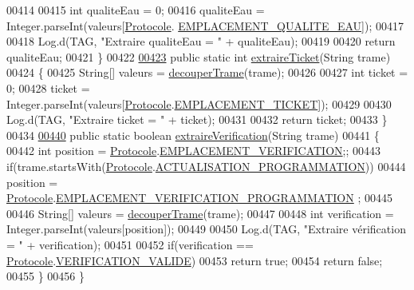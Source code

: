 \begin{DoxyCode}
00414 
00415         \textcolor{keywordtype}{int} qualiteEau = 0;
00416         qualiteEau = Integer.parseInt(valeurs[\hyperlink{classcom_1_1example_1_1ekawa_1_1_protocole}{Protocole}.
      \hyperlink{classcom_1_1example_1_1ekawa_1_1_protocole_aeb21f04096c5f1220c172bfdfbdd5dae}{EMPLACEMENT\_QUALITE\_EAU}]);
00417 
00418         Log.d(TAG, \textcolor{stringliteral}{"Extraire qualiteEau = "} + qualiteEau);
00419 
00420         \textcolor{keywordflow}{return} qualiteEau;
00421     \}
00422 
\hyperlink{classcom_1_1example_1_1ekawa_1_1_protocole_a4997ef198a7f87d76c2f68849caae8d7}{00423}     \textcolor{keyword}{public} \textcolor{keyword}{static} \textcolor{keywordtype}{int} \hyperlink{classcom_1_1example_1_1ekawa_1_1_protocole_a4997ef198a7f87d76c2f68849caae8d7}{extraireTicket}(String trame)
00424     \{
00425         String[] valeurs = \hyperlink{classcom_1_1example_1_1ekawa_1_1_protocole_a23c261e4ab5ad3c2ac60187f04ae40ea}{decouperTrame}(trame);
00426 
00427         \textcolor{keywordtype}{int} ticket = 0;
00428         ticket = Integer.parseInt(valeurs[\hyperlink{classcom_1_1example_1_1ekawa_1_1_protocole}{Protocole}.\hyperlink{classcom_1_1example_1_1ekawa_1_1_protocole_a6250b8095974b868336c880dc5c68f7f}{EMPLACEMENT\_TICKET}]);
00429 
00430         Log.d(TAG, \textcolor{stringliteral}{"Extraire ticket = "} + ticket);
00431 
00432         \textcolor{keywordflow}{return} ticket;
00433     \}
00434 
\hyperlink{classcom_1_1example_1_1ekawa_1_1_protocole_add9d5727209d29af21fa468e6929fe0b}{00440}     \textcolor{keyword}{public} \textcolor{keyword}{static} \textcolor{keywordtype}{boolean} \hyperlink{classcom_1_1example_1_1ekawa_1_1_protocole_add9d5727209d29af21fa468e6929fe0b}{extraireVerification}(String trame)
00441     \{
00442         \textcolor{keywordtype}{int} position = \hyperlink{classcom_1_1example_1_1ekawa_1_1_protocole}{Protocole}.\hyperlink{classcom_1_1example_1_1ekawa_1_1_protocole_ae76a20c0852f58c7dd77110816d8d809}{EMPLACEMENT\_VERIFICATION};;
00443         \textcolor{keywordflow}{if}(trame.startsWith(\hyperlink{classcom_1_1example_1_1ekawa_1_1_protocole}{Protocole}.\hyperlink{classcom_1_1example_1_1ekawa_1_1_protocole_a8127ee50bdfb556779ad1c920c498e83}{ACTUALISATION\_PROGRAMMATION}))
00444             position = \hyperlink{classcom_1_1example_1_1ekawa_1_1_protocole}{Protocole}.\hyperlink{classcom_1_1example_1_1ekawa_1_1_protocole_aab437189a20d6f6447262ed50c666bde}{EMPLACEMENT\_VERIFICATION\_PROGRAMMATION}
      ;
00445 
00446         String[] valeurs = \hyperlink{classcom_1_1example_1_1ekawa_1_1_protocole_a23c261e4ab5ad3c2ac60187f04ae40ea}{decouperTrame}(trame);
00447 
00448         \textcolor{keywordtype}{int} verification = Integer.parseInt(valeurs[position]);
00449 
00450         Log.d(TAG, \textcolor{stringliteral}{"Extraire vérification = "} + verification);
00451 
00452         \textcolor{keywordflow}{if}(verification == \hyperlink{classcom_1_1example_1_1ekawa_1_1_protocole}{Protocole}.\hyperlink{classcom_1_1example_1_1ekawa_1_1_protocole_a9a84f1d8388a25297e50fbc3d293ecf3}{VERIFICATION\_VALIDE})
00453             \textcolor{keywordflow}{return} \textcolor{keyword}{true};
00454         \textcolor{keywordflow}{return} \textcolor{keyword}{false};
00455     \}
00456 \}
\end{DoxyCode}
